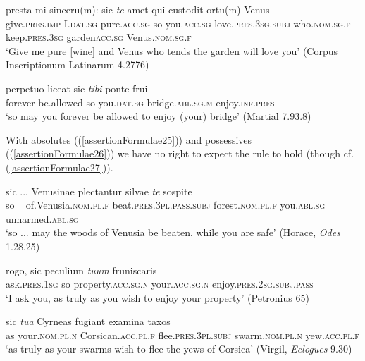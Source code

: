 \begin{exe}
\ex
\gll presta mi sinceru(m): sic \emph{te} amet qui custodit ortu(m) Venus\\
give.\textsc{pres.imp} I.\textsc{dat.sg} pure.\textsc{acc.sg} so you.\textsc{acc.sg} love.\textsc{pres.3sg.subj} who.\textsc{nom.sg.f} keep.\textsc{pres.3sg} garden\textsc{acc.sg} Venus.\textsc{nom.sg.f}\\
\trans `Give me pure {[}wine{]} and Venus who tends the garden will love you’ (Corpus Inscriptionum Latinarum 4.2776)
\label{assertionFormulae23}
\end{exe}

\begin{exe}
\ex
\gll perpetuo liceat sic \emph{tibi} ponte frui\\
forever be.allowed so you.\textsc{dat.sg} bridge.\textsc{abl.sg.m} enjoy.\textsc{inf.pres}\\
\trans `so may you forever be allowed to enjoy (your) bridge’ (Martial 7.93.8)
\label{assertionFormulae24}
\end{exe}

With  absolutes ((\ref{assertionFormulae25})) and possessives ((\ref{assertionFormulae26})) we have no right to expect the rule to hold (though cf. (\ref{assertionFormulae27})).

\begin{exe}
\ex
\gll sic ... Venusinae plectantur silvae \emph{te} sospite\\
so ~ of.Venusia.\textsc{nom.pl.f} beat.\textsc{pres.3pl.pass.subj} forest.\textsc{nom.pl.f} you.\textsc{abl.sg} unharmed.\textsc{abl.sg}\\
\trans `so ... may the woods of Venusia be beaten, while you are safe’ (Horace, \textit{Odes} 1.28.25)
\label{assertionFormulae25}
\end{exe}

\begin{exe}
\ex
\gll rogo, sic peculium \emph{tuum} fruniscaris\\
ask.\textsc{pres.1sg} so property.\textsc{acc.sg.n} your.\textsc{acc.sg.n} enjoy.\textsc{pres.2sg.subj.pass}\\
\trans `I ask you, as truly as you wish to enjoy your property’ (Petronius 65)
\label{assertionFormulae26}
\end{exe}

\begin{exe}
\ex
\gll sic \emph{tua} Cyrneas fugiant examina taxos\\
as your.\textsc{nom.pl.n} Corsican.\textsc{acc.pl.f} flee.\textsc{pres.3pl.subj} swarm.\textsc{nom.pl.n} yew.\textsc{acc.pl.f}\\
\trans `as truly as your swarms wish to flee the yews of Corsica’ (Virgil, \textit{Eclogues} 9.30)
\label{assertionFormulae27}
\end{exe}

